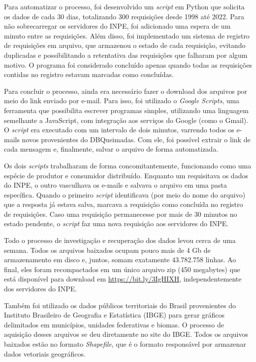 \documentclass[cic,tc]{iiufrgs}
\begin{document}
Para automatizar o processo, foi desenvolvido um \textit{script} em Python que solicita os dados de cada 30 dias, totalizando 300 requisições desde 1998 até 2022. Para não sobrecarregar os servidores do INPE, foi adicionado uma espera de um minuto entre as requisições. Além disso, foi implementado um sistema de registro de requisições em arquivo, que armazenou o estado de cada requisição, evitando duplicadas e possibilitando a retentativa das requisições que falharam por algum motivo. O programa foi considerado concluído apenas quando todas as requisições contidas no registro estavam marcadas como concluídas.

Para concluir o processo, ainda era necessário fazer o download dos arquivos por meio do link enviado por e-mail. Para isso, foi utilizado o \textit{Google Scripts}, uma ferramenta que possibilita escrever programas simples, utilizando uma linguagem semelhante a JavaScript, com integração aos serviços do Google (como o Gmail). O \textit{script} era executado com um intervalo de dois minutos, varrendo todos os e-mails novos provenientes do DBQueimadas. Com ele, foi possível extrair o link de cada mensagem e, finalmente, salvar o arquivo de forma automatizada. 

Os dois \textit{scripts} trabalharam de forma concomitantemente, funcionando como uma espécie de produtor e consumidor distribuído. Enquanto um requisitava os dados do INPE, o outro vasculhava os e-mails e salvava o arquivo em uma pasta específica. Quando o primeiro \textit{script} identificava (por meio do nome do arquivo) que a resposta já estava salva, marcava a requisição como concluída no registro de requisições. Caso uma requisição permanecesse por mais de 30 minutos no estado pendente, o \textit{script} faz uma nova requisição aos servidores do INPE.

Todo o processo de investigação e recuperação dos dados levou cerca de uma semana. Todos os arquivos baixados ocupam pouco mais de 4 Gb de armazenamento em disco e, juntos, somam exatamente 43.782.758 linhas. Ao final, eles foram recompactados em um único arquivo zip (450 megabytes) que está disponível para download em \url{https://bit.ly/3IgHIXH}, independentemente dos servidores do INPE.

Também foi utilizado os dados públicos territoriais do Brasil provenientes do Instituto Brasileiro de Geografia e Estatística (IBGE) para gerar gráficos delimitados em municípios, unidades federativas e biomas. O processo de aquisição desses arquivos se deu diretamente no site do IBGE. Todos os arquivos baixados estão no formato \textit{Shapefile}, que é o formato responsável por armazenar dados vetoriais geográficos.
\end{document}
